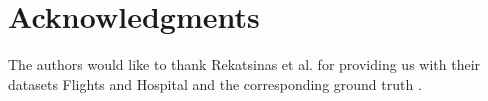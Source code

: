 \section*{Acknowledgments}

The authors would like to thank Rekatsinas et al. for providing us with their datasets Flights and Hospital and the corresponding ground truth \cite{rekatsinas2017holoclean}. %